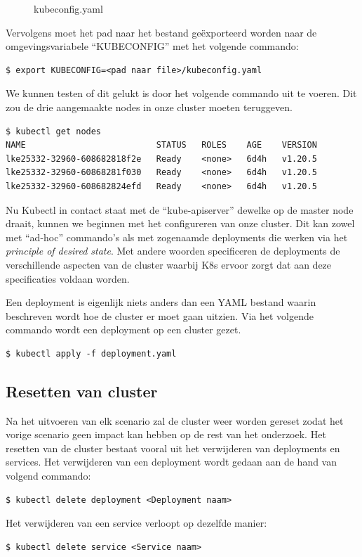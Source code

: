 \begin{figure}[h] 
	\inputminted[fontsize=\footnotesize,linenos]{yaml}{files/BachTest-kubeconfig.yaml}
	\caption{kubeconfig.yaml}
	\label{kubeconfig}
\end{figure}

Vervolgens moet het pad naar het bestand geëxporteerd worden naar de omgevingsvariabele ``KUBECONFIG'' met het volgende commando:
\begin{verbatim}
$ export KUBECONFIG=<pad naar file>/kubeconfig.yaml
\end{verbatim}

We kunnen testen of dit gelukt is door het volgende commando uit te voeren. Dit zou de drie aangemaakte nodes in onze cluster moeten teruggeven.
\begin{verbatim}
$ kubectl get nodes
NAME                          STATUS   ROLES    AGE    VERSION
lke25332-32960-608682818f2e   Ready    <none>   6d4h   v1.20.5
lke25332-32960-60868281f030   Ready    <none>   6d4h   v1.20.5
lke25332-32960-608682824efd   Ready    <none>   6d4h   v1.20.5
\end{verbatim}

Nu Kubectl in contact staat met de ``kube-apiserver'' dewelke op de master node draait, kunnen we beginnen met het configureren van onze cluster. Dit kan zowel met ``ad-hoc'' commando's als met zogenaamde deployments die werken via het \textit{principle of desired state}. Met andere woorden specificeren de deployments de verschillende  aspecten van de cluster waarbij K8s ervoor zorgt dat aan deze specificaties voldaan worden.

Een deployment is eigenlijk niets anders dan een YAML bestand waarin beschreven wordt hoe de cluster er moet gaan uitzien. Via het volgende commando wordt een deployment op een cluster gezet.
\begin{verbatim}
$ kubectl apply -f deployment.yaml
\end{verbatim}

\subsection{Resetten van cluster}
Na het uitvoeren van elk scenario zal de cluster weer worden gereset zodat het vorige scenario geen impact kan hebben op de rest van het onderzoek. Het resetten van de cluster bestaat vooral uit het verwijderen van deployments en services. Het verwijderen van een deployment wordt gedaan aan de hand van volgend commando:
\begin{verbatim}
$ kubectl delete deployment <Deployment naam>
\end{verbatim}
Het verwijderen van een service verloopt op dezelfde manier:
\begin{verbatim}
$ kubectl delete service <Service naam>
\end{verbatim}
	
